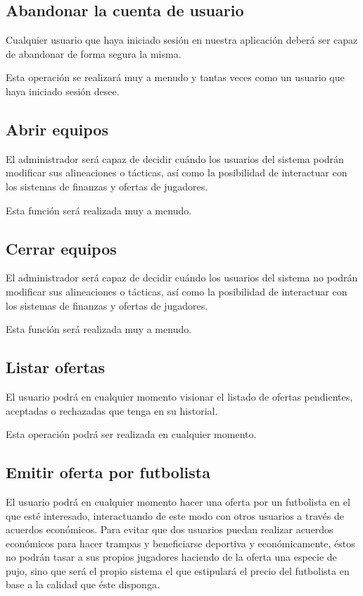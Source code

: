 \subsection{Abandonar la cuenta de usuario}
Cualquier usuario que haya iniciado sesión en nuestra aplicación deberá ser
capaz de abandonar de forma segura la misma.

Esta operación se realizará muy a menudo y tantas veces como un usuario que haya
iniciado sesión desee.

\subsection{Abrir equipos}
El administrador será capaz de decidir cuándo los usuarios del sistema podrán
modificar sus alineaciones o tácticas, así como la posibilidad de interactuar
con los sistemas de finanzas y ofertas de jugadores.

Esta función será realizada muy a menudo.

\subsection{Cerrar equipos}
El administrador será capaz de decidir cuándo los usuarios del sistema no podrán
modificar sus alineaciones o tácticas, así como la posibilidad de interactuar
con los sistemas de finanzas y ofertas de jugadores.

Esta función será realizada muy a menudo.

\subsection{Listar ofertas}
El usuario podrá en cualquier momento visionar el listado de ofertas pendientes,
aceptadas o rechazadas que tenga en su historial.

Esta operación podrá ser realizada en cualquier momento.

\subsection{Emitir oferta por futbolista}
El usuario podrá en cualquier momento hacer una oferta por un futbolista en el
que esté interesado, interactuando de este modo con otros usuarios a través de
acuerdos económicos. Para evitar que dos usuarios puedan realizar acuerdos
económicos para hacer trampas y beneficiarse deportiva y económicamente, éstos
no podrán tasar a sus propios jugadores haciendo de la oferta una especie de
pujo, sino que será el propio sistema el que estipulará el precio del futbolista
en base a la calidad que éste disponga.

